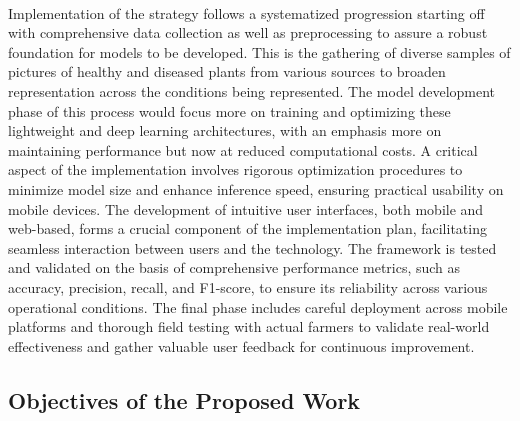 \

Implementation of the strategy follows a systematized progression starting off with comprehensive data collection as well as preprocessing to assure a robust foundation for models to be developed. This is the gathering of diverse samples of pictures of healthy and diseased plants from various sources to broaden representation across the conditions being represented. The model development phase of this process would focus more on training and optimizing these lightweight and deep learning architectures, with an emphasis more on maintaining performance but now at reduced computational costs. A critical aspect of the implementation involves rigorous optimization procedures to minimize model size and enhance inference speed, ensuring practical usability on mobile devices. The development of intuitive user interfaces, both mobile and web-based, forms a crucial component of the implementation plan, facilitating seamless interaction between users and the technology. The framework is tested and validated on the basis of comprehensive performance metrics, such as accuracy, precision, recall, and F1-score, to ensure its reliability across various operational conditions. The final phase includes careful deployment across mobile platforms and thorough field testing with actual farmers to validate real-world effectiveness and gather valuable user feedback for continuous improvement.

\subsection{ Objectives of the Proposed Work}


